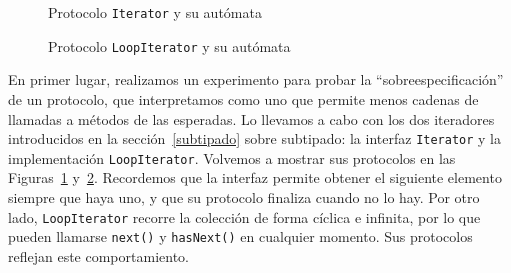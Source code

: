 \begin{figure}[htbp]
\centering
\begin{minipage}[c]{0.50\textwidth}
    
\end{minipage}
\hfill
\begin{minipage}[c]{0.46\textwidth}
\centering
{}
\end{minipage}
\caption{Protocolo \texttt{Iterator} y su autómata}
\label{exp:iterator_protocol}
\end{figure}

\begin{figure}[htbp]
\centering
\begin{minipage}[c]{0.50\textwidth}
    
\end{minipage}
\hfill
\begin{minipage}[c]{0.46\textwidth}
\centering
{}
\end{minipage}
\caption{Protocolo \texttt{LoopIterator} y su autómata}
\label{exp:loopiterator_protocol}
\end{figure}

En primer lugar, realizamos un experimento para probar la ``sobreespecificación'' de un protocolo, que interpretamos como uno que permite menos cadenas de llamadas a métodos de las esperadas. Lo llevamos a cabo con los dos iteradores introducidos en la sección~\ref{subtipado} sobre subtipado: la interfaz \texttt{Iterator} y la implementación \texttt{LoopIterator}. Volvemos a mostrar sus protocolos en las Figuras~\ref{exp:iterator_protocol} y~\ref{exp:loopiterator_protocol}. Recordemos que la interfaz permite obtener el siguiente elemento siempre que haya uno, y que su protocolo finaliza cuando no lo hay. Por otro lado, \texttt{LoopIterator} recorre la colección de forma cíclica e infinita, por lo que pueden llamarse \texttt{next()} y \texttt{hasNext()} en cualquier momento. Sus protocolos reflejan este comportamiento.


